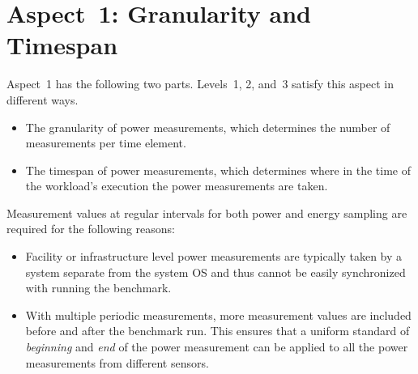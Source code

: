\section{Aspect~1: Granularity and Timespan}
\label{sec:A1GTRM}

Aspect~1 has the following two parts.
Levels~1, 2, and~3 satisfy this aspect in different ways.

\begin{itemize}
\item
The granularity of power measurements, which determines the number of measurements per time element.
\item
The timespan of power measurements, which determines where in the time of the workload's execution the power measurements are taken.
\end{itemize}

Measurement values at regular intervals for both power and energy sampling are required for the following reasons:

\begin{itemize}
\item
Facility or infrastructure level power measurements are typically taken by a system separate from the system OS and thus cannot be easily synchronized with running the benchmark.
\item
With multiple periodic measurements, more measurement values are included before and after the benchmark run.
This ensures that a uniform standard of \textit{beginning} and \textit{end} of the power measurement can be applied to all the power measurements from different sensors.
\end{itemize}



